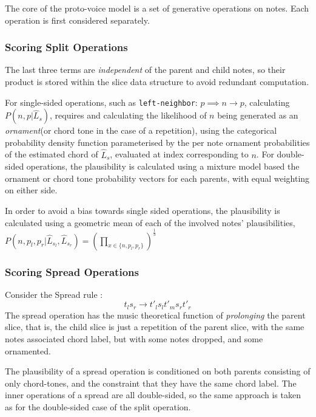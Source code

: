 \documentclass[12pt,a4paper,twoside,openany]{report} \usepackage[pdfborder={0 0 0}]{hyperref}    %
\theoremstyle{definition} \newtheorem{definition}{Definition}[section]
\begin{document}
  The core of the proto-voice model is a set of generative operations on notes. Each operation is first
  considered separately.

    \subsubsection{Scoring Split Operations} 

    The last three terms are \textit{independent} of the parent and child notes, so their product is stored within the slice data structure to
    avoid redundant computation.

    For single-sided operations, such as \texttt{left-neighbor}: $p \implies n \to p$, calculating $P(n, p|\hat{L}_s)$, requires
    and calculating the likelihood of $n$ being generated as an \textit{ornament}(or chord tone in the case of
    a repetition), using the categorical probability density function parameterised by the per note ornament
    probabilities of the estimated chord of $\hat{L}_s$, evaluated at index corresponding to $n$. For double-sided
    operations, the plausibility is calculated using a mixture model based the ornament or chord tone probability
    vectors for each parents, with equal weighting on either side. 

    In order to avoid a bias towards single sided operations, the plausibility is calculated using a geometric mean of
    each of the involved notes' plausibilities, $P(n,p_l,p_r|\hat{L}_{s_l}, \hat{L}_{s_r}) = (\prod\limits_{x\in \{n,
    p_l, p_r\}})^{\frac{1}{3}}$

    \FloatBarrier \subsubsection{Scoring Spread Operations}

    Consider the Spread rule : \[t_l s_r \to t'_l s_l t'_m s_r t'_r\] 
    The spread operation has the music theoretical function of \textit{prolonging} the parent slice, that is, the child
    slice is just a repetition of the parent slice, with the same notes associated chord label, but with some notes
    dropped, and some ornamented. 

    The plausibility of a spread operation is conditioned on both parents consisting of only chord-tones, and the
    constraint that they have the same chord label. The inner operations of a spread are all double-sided, so the same
    approach is taken as for the double-sided case of the split operation.
\end{document}
